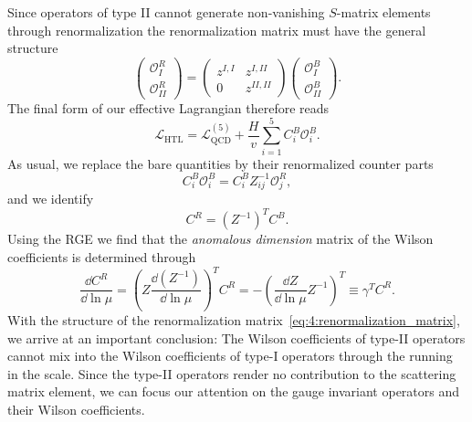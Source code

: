 Since operators of type II cannot generate non-vanishing $S$-matrix elements through renormalization the renormalization matrix must have the general structure
\begin{equation}
\begin{pmatrix}
\mathcal{O}_{I}^R \\
\mathcal{O}_{II}^R
\end{pmatrix} = \begin{pmatrix}
z^{I,I} & z^{I,II} \\
0 & z^{II,II}
\end{pmatrix} \begin{pmatrix}
\mathcal{O}_{I}^B \\
\mathcal{O}_{II}^B
\end{pmatrix}.
\label{eq:4:renormalization_matrix}
\end{equation}
The final form of our effective Lagrangian therefore reads
\begin{equation}
\mathcal{L}_{\text{HTL}} = \mathcal{L}_{\text{QCD}}^{(5)} + \frac{H}{v} \sum_{i=1}^5 C_i^B \mathcal{O}_i^B.
\label{eq:4:lagrangian_operator_basis}
\end{equation}
As usual, we replace the bare quantities by their renormalized counter parts
\begin{equation}
C_i^B \mathcal{O}_i^B = C_i^B  Z_{ij}^{-1} \mathcal{O}_j^R,
\end{equation}
and we identify
\begin{equation}
C^R = (Z^{-1})^T C^B.
\end{equation}
Using the \acs{RGE} we find that the \textit{anomalous dimension} matrix of the Wilson coefficients is determined through
\begin{equation}
\frac{\dd C^R}{\dd \ln \mu} = \left(Z \frac{\dd (Z^{-1})}{\dd \ln \mu} \right)^T  C^R = - \left( \frac{\dd Z}{\dd \ln \mu} Z^{-1} \right)^T \equiv \gamma^T C^R .
\label{eq:4:anomalous_dimension_matrix}
\end{equation}
With the structure of the renormalization matrix~\eqref{eq:4:renormalization_matrix}, we arrive at an important conclusion: The Wilson coefficients of type-II operators cannot mix into the Wilson coefficients of type-I operators through the running in the scale. Since the type-II operators render no contribution to the scattering matrix element, we can focus our attention on the gauge invariant operators and their Wilson coefficients.

